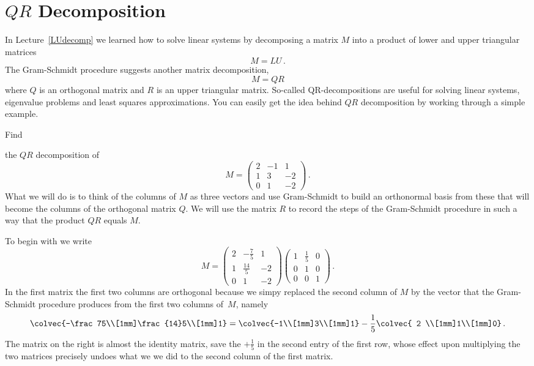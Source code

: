 \section{$QR$ Decomposition}
In Lecture~\ref{LUdecomp} we learned how to solve linear systems by decomposing a matrix $M$ into 
a product of lower and upper triangular matrices
\[M=LU\, .\]
The Gram-Schmidt procedure suggests another matrix decomposition,
\[M=QR\] 
where $Q$ is an orthogonal matrix and $R$ is an upper triangular matrix. So-called QR-decompositions
are useful for solving linear systems, eigenvalue problems and least squares approximations. You can
easily get the idea behind $QR$ decomposition by working through a simple example.

\begin{example}
\hypertarget{methodQR}{Find} the $QR$ decomposition of \[M=\begin{pmatrix}2&-1&1\\1&3&-2\\0&1&-2\end{pmatrix}\, .\]
What we will do is to think of the columns of $M$ as three vectors and use Gram-Schmidt to
build an orthonormal basis from these that will become the columns of the orthogonal matrix $Q$.
We will use the matrix $R$ to record the steps of the Gram-Schmidt procedure in such a way
that the product $QR$ equals $M$. 

To begin with we write
\[
M=\begin{pmatrix}2&-\frac75&1\\[1mm]1&\frac{14}5&-2\\[1mm]0&1&-2\end{pmatrix}
\begin{pmatrix}1&\frac15&0\\[1mm]0&1&0\\[1mm]0&0&1\end{pmatrix}\, .
\]
In the first matrix the first two columns are  orthogonal because we simpy replaced the second column of $M$ by the vector that the Gram-Schmidt
procedure produces from the first two columns of~$M$, namely
\[
\colvec{-\frac75\\[1mm]\frac{14}5\\[1mm]1}=\colvec{-1\\[1mm]3\\[1mm]1}-\frac15
\colvec{ 2 \\[1mm]1\\[1mm]0}\, .
\]
 The matrix on the right is almost the identity
matrix, save the $+\frac15$ in the second entry of the first row, whose effect upon multiplying the
two matrices precisely undoes what we we did to the second column of the first matrix. 


\end{example}
